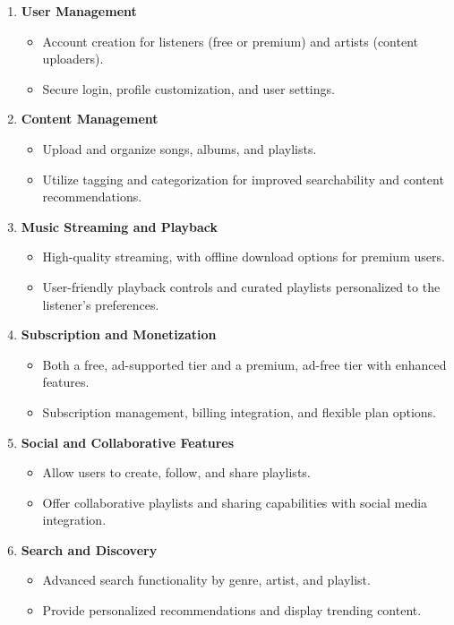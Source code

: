 \documentclass[a4paper,10pt]{article}
\begin{document}
\begin{enumerate}[label=\arabic*.]
    \item \textbf{User Management}  
    \begin{itemize}
        \item Account creation for listeners (free or premium) and artists (content uploaders).
        \item Secure login, profile customization, and user settings.
    \end{itemize}
    
    \item \textbf{Content Management}  
    \begin{itemize}
        \item Upload and organize songs, albums, and playlists.
        \item Utilize tagging and categorization for improved searchability and content recommendations.
    \end{itemize}

    \item \textbf{Music Streaming and Playback}  
    \begin{itemize}
        \item High-quality streaming, with offline download options for premium users.
        \item User-friendly playback controls and curated playlists personalized to the listener’s preferences.
    \end{itemize}

    \item \textbf{Subscription and Monetization}  
    \begin{itemize}
        \item Both a free, ad-supported tier and a premium, ad-free tier with enhanced features.
        \item Subscription management, billing integration, and flexible plan options.
    \end{itemize}

    \item \textbf{Social and Collaborative Features}  
    \begin{itemize}
        \item Allow users to create, follow, and share playlists.
        \item Offer collaborative playlists and sharing capabilities with social media integration.
    \end{itemize}
\newpage
    \item \textbf{Search and Discovery}  
    \begin{itemize}
        \item Advanced search functionality by genre, artist, and playlist.
        \item Provide personalized recommendations and display trending content.
    \end{itemize}


\end{enumerate}
\end{document}
